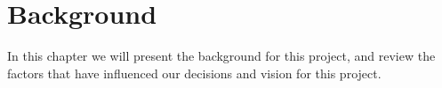 \chapter{Background}
In this chapter we will present the background for this project, and review the factors that have
influenced our decisions and vision for this project.